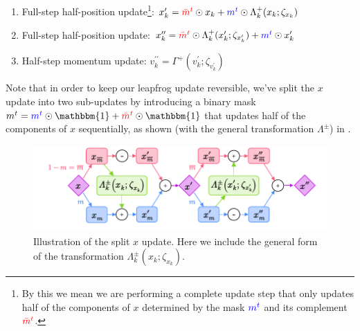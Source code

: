 \documentclass{article} %
\newcommand{\mbart}{\textcolor{red}{\bar{m}^{t}}}
\newcommand{\mt}{\textcolor{blue}{m^{t}}}
\begin{document}
{\begin{enumerate}
      \hspace{29pt}\(%
         v^{\prime}_{k} = \Gamma^{+}_{k}(v_{k};\zeta_{v_{k}})%
   \)
   \item Full-step half-position update\footnote{By this we mean we are performing a complete update step that only
      updates half of the components of \(x\) determined by the mask \(\mt\) and its complement \(\mbart\).}:
      \hspace{17pt} \(%
         x^{\prime}_{k} = \mbart\odot x_{k} + \mt\odot \Lambda^{+}_{k}(x_{k};\zeta_{x_{k}})
   \)
   \item Full-step half-position update:%
      \hspace{20pt} \(%
         x^{\prime\prime}_{k} = \mbart\odot\Lambda^{+}_{k}(x^{\prime}_{k};\zeta_{x^{\prime}_{k}}) + \mt\odot x^{\prime}_{k}
   \)
   \item Half-step momentum update:%
      \hspace{24pt} \(%
         v^{\prime\prime}_{k} = \Gamma^{+}(v^{\prime}_{k}; \zeta_{v^{\prime}_{k}})
   \)
\end{enumerate}
%
Note that in order to keep our leapfrog update reversible, we've split the \(x\) update into two sub-updates by
introducing a binary mask \(m^{t} = \mt\odot\mathbbm{1} + \mbart\odot\mathbbm{1}\) that updates half of the components
of \(x\) sequentially, as shown (with the general transformation \(\Lambda^{\pm}\)) in .
%
\begin{figure}[htpb]
   \centering
   \includegraphics[width=\textwidth]{figures/splitx10.pdf}
   \caption{\label{fig:splitx}Illustration of the split \(x\) update. Here we include the general form of the
   transformation \(\Lambda^{\pm}_{k}(x_{k};\zeta_{x_{k}})\).}
\end{figure}
%

}
\end{document}
